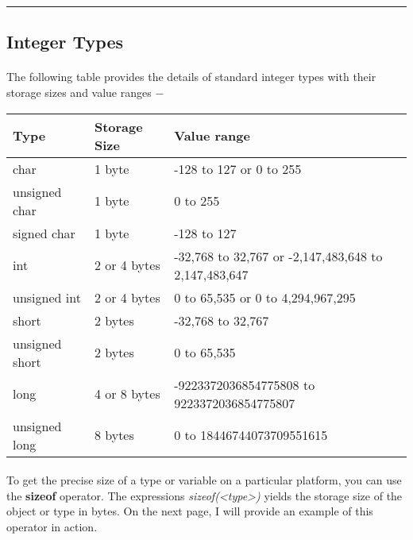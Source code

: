 \rule{\textwidth}{0.3ex}\par

\subsection{Integer Types}
   \paragraph{}
      The following table provides the details of standard integer types with their storage sizes and value ranges −
      \begin{center}
         \begin{tabular}{ ||p{1in}| p{1in} | p{4in}|| }
            \hline
            \textbf{Type} & \textbf{Storage Size} & \textbf{Value range} \\ [1.75ex]
            \hline\hline
            char & 1 byte & -128 to 127 or 0 to 255 \\
            \hline
            unsigned char & 1 byte & 0 to 255 \\
            \hline
            signed char & 1 byte & -128 to 127 \\
            \hline
            int & 2 or 4 bytes & -32,768 to 32,767 or -2,147,483,648 to 2,147,483,647 \\
            \hline
            unsigned int & 2 or 4 bytes & 0 to 65,535 or 0 to 4,294,967,295 \\
            \hline
            short & 2 bytes & -32,768 to 32,767 \\
            \hline
            unsigned short & 2 bytes & 0 to 65,535 \\
            \hline
            long & 4 or 8 bytes & -9223372036854775808 to 9223372036854775807 \\ [0.8ex]
            \hline
            unsigned long & 8 bytes & 0 to 18446744073709551615 \\
            \hline
         \end{tabular}
      \end{center}

\paragraph{}
   To get the precise size of a type or variable on a particular platform, you can use the \textbf{sizeof} operator.
   The expressions \textit{sizeof(<type>)} yields the storage size of the object or type in bytes. On the next page, I will provide an example of 
   this operator in action.

